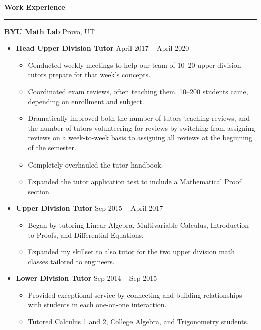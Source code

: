 \documentclass{article}
\newenvironment{compactItemize}{
  \begin{itemize}[itemsep=0ex, parsep=0ex, partopsep=0ex, topsep= -7pt]
}{
  \end{itemize}
}
\begin{document}
\textbf{Work Experience}
\smallskip
\hrule

\textbf{BYU Math Lab} Provo, UT
\begin{compactItemize}
  \item \textbf{Head Upper Division Tutor} April 2017 -- April 2020
    \begin{compactItemize}
      \item Conducted weekly meetings to help our team of 10--20 upper division tutors prepare for that week's concepts.
      \item Coordinated exam reviews, often teaching them.  10--200 students came, depending on enrollment and subject.
      \item Dramatically improved both the number of tutors teaching reviews, and the number of tutors volunteering for reviews
            by switching from assigning reviews on a week-to-week basis to assigning all reviews at the beginning of the semester.  
      \item Completely overhauled the tutor handbook.
      \item Expanded the tutor application test to include a Mathematical Proof section.
    \end{compactItemize}
  \item \textbf{Upper Division Tutor} Sep 2015 -- April 2017
    \begin{compactItemize}
      \item Began by tutoring Linear Algebra, Multivariable Calculus, Introduction to Proofs, and Differential Equations.
      \item Expanded my skillset to also tutor for the two upper division math classes tailored to engineers. 
    \end{compactItemize}
  \item \textbf{Lower Division Tutor} Sep 2014 -- Sep 2015
    \begin{compactItemize}
      \item Provided exceptional service by connecting and building relationships with students in each one-on-one interaction.
      \item Tutored Calculus 1 and 2, College Algebra, and Trigonometry students.
    \end{compactItemize}
\end{compactItemize}
\medskip
\end{document}
